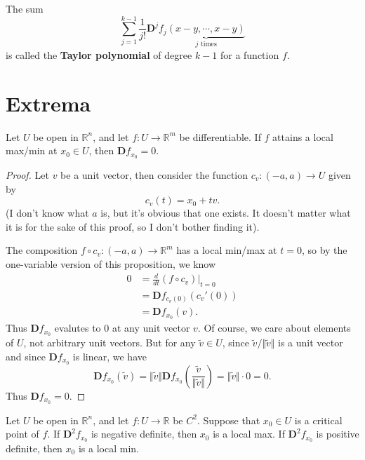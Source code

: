 \documentclass[10pt]{report}
\begin{document}
\begin{defn}[]
The sum
\[
\sum_{j=1}^{k-1} \frac{1}{j!} \mathbf{D}^j f_j \underbrace{(x-y, \cdots, x-y)}_{j \text{ times}}
\] is called the \textbf{Taylor polynomial} of degree $k-1$ for a function $f$.
\end{defn}


\section{Extrema}

\begin{prop}
	Let $U$ be open in $\mathbb{R}^n$, and let $f: U \to \mathbb{R}^m$ be differentiable. If $f$ attains a local max/min at $x_0 \in U$, then $\mathbf{D}f_{x_0}=0$.
\end{prop}
\begin{proof}
	Let $v$ be a unit vector, then consider the function $c_v: (-a, a) \to U$ given by
	\[
		c_v(t) = x_0 + tv.
	\] (I don't know what $a$ is, but it's obvious that one exists. It doesn't matter what it is for the sake of this proof, so I don't bother finding it).

	The composition $f \circ c_v: (-a, a) \to \mathbb{R}^m$ has a local min/max at $t=0$, so by the one-variable version of this proposition, we know
	\begin{align*}
		0 &= \frac{d }{d t} (f \circ c_v) \Big|_{t=0} \\
		  &= \mathbf{D}f_{c_v(0)} (c_v'(0)) \\
		  &= \mathbf{D}f_{x_0} (v).
	\end{align*}
	Thus $\mathbf{D}f_{x_0}$ evalutes to 0 at any unit vector $v$. Of course, we care about elements of $U$, not arbitrary unit vectors. But for any $\tilde{v} \in U$, since $\tilde{v}/ \Vert{\tilde{v}}\Vert$ is a unit vector and since $\mathbf{D}f_{x_0}$ is linear, we have
	\[
		\mathbf{D}f_{x_0}(\tilde{v}) = \Vert{\tilde{v}}\Vert \mathbf{D}f_{x_0}\left( \frac{\tilde{v}}{\Vert{\tilde{v}}\Vert}  \right) = \Vert{\tilde{v}}\Vert \cdot 0 = 0.
	\] Thus $\mathbf{D}f_{x_0}=0.$
\end{proof}

\begin{thrm}{}{}
Let $U$ be open in $\mathbb{R}^n$, and let $f:U \to \mathbb{R}$ be $C^2$. Suppose that $x_0 \in U$ is a critical point of $f$. If $\mathbf{D}^2f_{x_0}$ is negative definite, then $x_0$ is a local max. If $\mathbf{D}^2f_{x_0}$ is positive definite, then $x_0$ is a local min.
\end{thrm}
\end{document}
